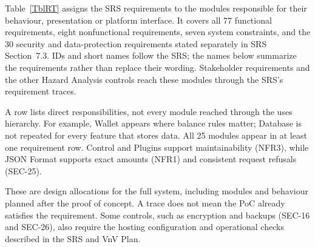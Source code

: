\documentclass[12pt, titlepage]{article}
\begin{document}
Table~\ref{TblRT} assigns the SRS requirements to the modules responsible
for their behaviour, presentation or platform interface. It covers all 77
functional requirements, eight nonfunctional requirements, seven system
constraints, and the 30 security and data-protection requirements stated
separately in SRS Section~7.3. IDs and short names follow the SRS; the names
below summarize the requirements rather than replace their wording.
Stakeholder requirements and the other Hazard Analysis controls reach these
modules through the SRS's requirement traces.

A row lists direct responsibilities, not every module reached through the
uses hierarchy. For example, Wallet appears where balance rules matter;
Database is not repeated for every feature that stores data. All 25 modules
appear in at least one requirement row. Control and Plugins support
maintainability (NFR3), while JSON Format supports exact amounts (NFR1) and
consistent request refusals (SEC-25).

These are design allocations for the full system, including modules and
behaviour planned after the proof of concept. A trace does not mean the PoC
already satisfies the requirement. Some controls, such as encryption and
backups (SEC-16 and SEC-26), also require the hosting configuration and
operational checks described in the SRS and VnV Plan.
\end{document}
